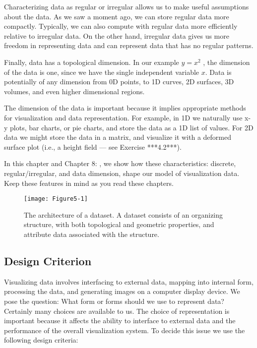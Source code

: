 Characterizing data as regular or irregular allows us to make useful assumptions about the data. As we saw a moment ago, we can store regular data more compactly. Typically, we can also compute with regular data more efficiently relative to irregular data. On the other hand, irregular data gives us more freedom in representing data and can represent data that has no regular patterns.

Finally, data has a topological dimension. In our example $y = x^2$ , the dimension of the data is one, since we have the single independent variable $x$. Data is potentially of any dimension from 0D points, to 1D curves, 2D surfaces, 3D volumes, and even higher dimensional regions.

The dimension of the data is important because it implies appropriate methods for visualization and data representation. For example, in 1D we naturally use x-y plots, bar charts, or pie charts, and store the data as a 1D list of values. For 2D data we might store the data in a matrix, and visualize it with a deformed surface plot (i.e., a height field — see Exercise ***4.2***).

In this chapter and Chapter 8: , we show how these characteristics: discrete, regular/irregular, and data dimension, shape our model of visualization data. Keep these features in mind as you read these chapters.

\begin{figure}[!htb]
	\centering
	\texttt{[image: Figure5-1]}
	\caption{The architecture of a dataset. A dataset consists of an organizing structure, with both topological and geometric properties, and attribute data associated with the structure.}
	\label{fig:Figure5-1}
\end{figure}

\subsection{Design Criterion}

Visualizing data involves interfacing to external data, mapping into internal form, processing the data, and generating images on a computer display device. We pose the question: What form or forms should we use to represent data? Certainly many choices are available to us. The choice of representation is important because it affects the ability to interface to external data and the performance of the overall visualization system. To decide this issue we use the following design criteria:


